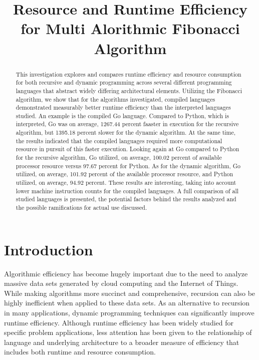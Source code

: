 \documentclass{sig-alternate}
\title{Resource and Runtime Efficiency for Multi Alorithmic Fibonacci Algorithm}
\begin{document}
\maketitle
\thispagestyle{firstpage}
\pagestyle{plain}




\begin{abstract}

This investigation explores and compares runtime efficiency and resource consumption for both recursive and dynamic programming across several different programming languages that abstract widely differing architectural elements. Utilizing the Fibonacci algorithm, we show that for the algorithms investigated, compiled languages demonstrated measurably better runtime efficiency than the interpreted languages studied. An example is the compiled Go language. Compared to Python, which is interpreted, Go was on average, 1267.44 percent faaster in execution for the recursive algorithm, but 1395.18 percent slower for the dynamic algorithm. At the same time, the results indicated that the compiled languages required more computational resource in pursuit of this faster execution. Looking again at Go compared to Python for the recursive algorithm, Go utilized, on average, 100.02 percent of available processor resource versus 97.67 percent for Python. As for the dynamic algorithm, Go utilized, on average, 101.92 percent of the available processor resource, and Python utilized, on average, 94.92 percent. These results are interesting, taking into account lower machine instruction counts for the compiled languages. A full comparison of all studied languages is presented, the potential factors behind the results analyzed and the possible ramifications for actual use discussed.

\end{abstract}

\section{Introduction}
Algorithmic efficiency has become hugely important due to the need to analyze massive data sets generated by cloud computing and the Internet of Things. While making algorithms more succinct and comprehensive, recursion can also be highly inefficient when applied to these data sets. As an alternative to recursion in many applications, dynamic programming techniques can significantly improve runtime efficiency. Although runtime efficiency has been widely studied for specific problem applications, less attention has been given to the relationship of language and underlying architecture to a broader measure of efficiency that includes both runtime and resource consumption.
\end{document}
